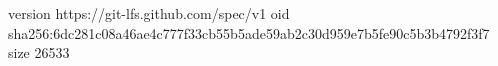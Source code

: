 version https://git-lfs.github.com/spec/v1
oid sha256:6dc281c08a46ae4c777f33cb55b5ade59ab2c30d959e7b5fe90c5b3b4792f3f7
size 26533
